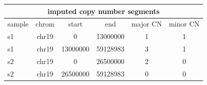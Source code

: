 \documentclass{standalone}
\begin{document}
\begin{tabular}{|l|c|c|c|c|c|}
\hline
\multicolumn{6}{|c|}{\textbf{imputed copy number segments}}\\
\hline 

sample & chrom & start & end & major CN & minor CN \\
\hline
s1 & chr19 & 0 & 13000000 & 1 & 1 \\
s1 & chr19 & 13000000 & 59128983 & 3 & 1 \\
s2 & chr19 & 0 & 26500000 & 2 & 0 \\
s2 & chr19 & 26500000 & 59128983 & 0 & 0 \\
\hline
\end{tabular}
\end{document}
